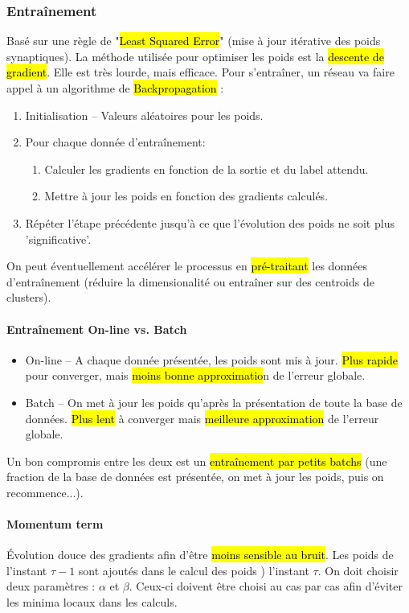 \documentclass[letterpaper, 12pt]{article}
\newcommand{\alinea}{
\hspace*{0.5cm}}
\begin{document}
			\subsubsection{Entraînement}
				\alinea Basé sur une règle de "\hl{Least Squared Error}" (mise à jour itérative des poids synaptiques).
					La méthode utilisée pour optimiser les poids est la \hl{descente de gradient}. Elle est très lourde,
					mais efficace. Pour s'entraîner, un réseau va faire appel à un algorithme de \hl{Backpropagation} :
					\begin{enumerate}
						\setlength\itemsep{0cm}
						\item Initialisation -- Valeurs aléatoires pour les poids.
						\item Pour chaque donnée d'entraînement:	
							\begin{enumerate}
								\setlength\itemsep{0cm}
								\item Calculer les gradients en fonction de la sortie et du label attendu.
								\item Mettre à jour les poids en fonction des gradients calculés.
							\end{enumerate}
						\item Répéter l'étape précédente jusqu'à ce que l'évolution des poids ne soit plus 'significative'.
					\end{enumerate}
					On peut éventuellement accélérer le processus en \hl{pré-traitant} les données d'entraînement (réduire la dimensionalité
					ou entraîner sur des centroids de clusters).
				\paragraph{Entraînement On-line vs. Batch} 
					\begin{itemize}
						\setlength\itemsep{0cm}
						\item On-line -- A chaque donnée présentée, les poids sont mis à jour. \hl{Plus rapide} pour converger, 
							mais \hl{moins bonne approximatio}n de l'erreur globale.
						\item Batch -- On met à jour les poids qu'après la présentation de toute la base de données. \hl{Plus lent} 
							à converger mais \hl{meilleure approximation} de l'erreur globale.
					\end{itemize}
					Un bon compromis entre les deux est un \hl{entraînement par petits batchs} (une fraction de la base de données 
					est présentée, on met à jour les poids, puis on recommence...).
				\paragraph{Momentum term} \'Evolution douce des gradients afin d'être \hl{moins sensible au bruit}.
					Les poids de l'instant $\tau - 1$ sont ajoutés dans le calcul des poids ) l'instant $\tau$. On doit choisir
					deux paramètres : $\alpha$ et $\beta$. Ceux-ci doivent être choisi au cas par cas afin d'éviter les minima locaux
					dans les calculs.
\end{document}
